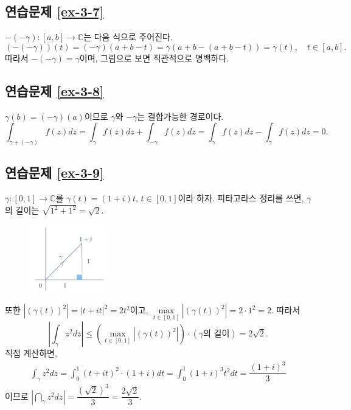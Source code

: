 \subsection*{연습문제 \ref{ex-3-7}}

$-(-\gamma): [a,b] \to \mathbb C$는 다음 식으로 주어진다.
\[
(-(-\gamma))(t)= (-\gamma)(a+b-t) = \gamma(a+b-(a+b-t)) = \gamma(t),
\quad t\in[a,b].
\]
따라서 $-(-\gamma) = \gamma$이며, 그림으로 보면 직관적으로 명백하다.

\subsection*{연습문제 \ref{ex-3-8}}

$\gamma(b) = (-\gamma)(a)$이므로
$\gamma$와 $-\gamma$는 결합가능한 경로이다.
\[
\int_{\gamma+(-\gamma)} f(z) dz = \int_\gamma f(z) dz + \int_{-\gamma} f(z)dz
=  \int_\gamma f(z) dz - \int_\gamma f(z) dz = 0.
\]

\subsection*{연습문제 \ref{ex-3-9}}

$\gamma:[0,1] \to \mathbb C$를 $\gamma(t) = (1+i)t$, $t\in [0,1]$이라 하자.
피타고라스 정리를 쓰면, $\gamma$의 길이는 $\sqrt{1^2+1^2} = \sqrt{2}$.

\begin{figure}[h!]
\begin{center}
\includegraphics[width=0.3\textwidth]{./Solution/figs/fig-s-0-8}
\end{center}
\end{figure}

또한 $|(\gamma(t))^2| = |t+it|^2 = 2t^2$이고,
$\max\limits_{t\in[0,1]} |(\gamma(t))^2| = 2\cdot 1^2 = 2$.
따라서
\[
\left| \int_\gamma z^2dz \right|
\le \left( \max\limits_{t\in[0,1]} |(\gamma(t))^2|  \right) \cdot
(\text{$\gamma$의 길이})
= 2\sqrt{2}.
\]
직접 계산하면,
\begin{align*}
\int_\gamma z^2 dz = \int_0^1 (t+it)^2\cdot(1+i)dt
= \int_0^1 (1+i)^3t^2dt = \dfrac{(1+i)^3}3
\end{align*}
이므로
$\left| \dint_\gamma z^2 dz \right| = \dfrac{(\sqrt{2})^3}3 = \dfrac{2\sqrt{2}}3$.

